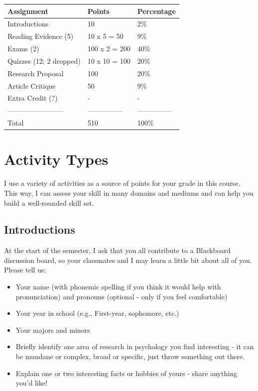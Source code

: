 \documentclass[
  12pt,
  letterpaper,
]{scrartcl}
\providecommand{\tightlist}{%
  \setlength{\itemsep}{0pt}\setlength{\parskip}{0pt}}\usepackage{longtable,booktabs,array}
\begin{document}
\begin{longtable}[]{@{}lll@{}}
\toprule\noalign{}
Assignment & Points & Percentage \\
\midrule\noalign{}
\endhead
\bottomrule\noalign{}
\endlastfoot
Introductions & 10 & 2\% \\
Reading Evidence (5) & 10 x 5 = 50 & 9\% \\
Exams (2) & 100 x 2 = 200 & 40\% \\
Quizzes (12; 2 dropped) & 10 x 10 = 100 & 20\% \\
Research Proposal & 100 & 20\% \\
Article Critique & 50 & 9\% \\
Extra Credit (?) & - & - \\
------------------------ & --------------- & --------------- \\
Total & 510 & 100\% \\
\end{longtable}

\section{Activity Types}\label{activity-types}

I use a variety of activities as a source of points for your grade in
this course. This way, I can assess your skill in many domains and
mediums and can help you build a well-rounded skill set.

\subsection{Introductions}\label{introductions}

At the start of the semester, I ask that you all contribute to a
Blackboard discussion board, so your classmates and I may learn a little
bit about all of you. Please tell us:

\begin{itemize}
\tightlist
\item
  Your name (with phonemic spelling if you think it would help with
  pronunciation) and pronouns (optional - only if you feel comfortable)
\item
  Your year in school (e.g., First-year, sophomore, etc.)
\item
  Your majors and minors
\item
  Briefly identify one area of research in psychology you find
  interesting - it can be mundane or complex, broad or specific, just
  throw something out there.
\item
  Explain one or two interesting facts or hobbies of yours - share
  anything you'd like!
\end{itemize}
\end{document}
